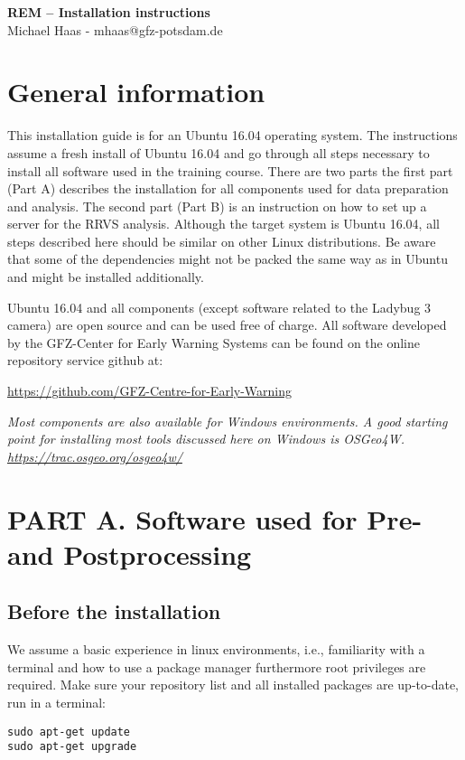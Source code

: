 \documentclass{article}
\begin{document}
\begin{titlepage}
\textbf{\huge REM – Installation instructions}\\
\centering Michael Haas - mhaas@gfz-potsdam.de
\end{titlepage}


\section{General information}

This installation guide is for an Ubuntu 16.04 operating system.
The instructions assume a fresh install of Ubuntu 16.04 and go through 
all steps necessary to install all software used in the training 
course. There are two parts the first part (Part A) 
describes the installation for all components used for data preparation
and analysis. The second part (Part B) is an instruction on how
to set up a server for the RRVS analysis.
Although the target system is Ubuntu 16.04, all steps 
described here should be similar on other Linux distributions.
Be aware that some of the dependencies might not be packed the 
same way as in Ubuntu and might be installed additionally.

Ubuntu 16.04 and all components 
(except software related to the Ladybug 3 camera) 
are open source and can be used free of charge. 
All software developed by the GFZ-Center for Early Warning Systems 
can be found on the online
repository service github at:

\url{https://github.com/GFZ-Centre-for-Early-Warning} 

\textit{Most components are also available for Windows environments.
A good starting point 
for installing most tools discussed here on Windows is OSGeo4W.
\url{https://trac.osgeo.org/osgeo4w/}}


\section{PART A. Software used for Pre- and Postprocessing}

\subsection{Before the installation}

We assume a basic experience in linux environments, i.e., familiarity
with a terminal and how to use a package manager furthermore root
privileges are required.
Make sure your repository list and all installed packages 
are up-to-date, run in a terminal:
\begin{verbatim}
sudo apt-get update
sudo apt-get upgrade
\end{verbatim}
\end{document}
